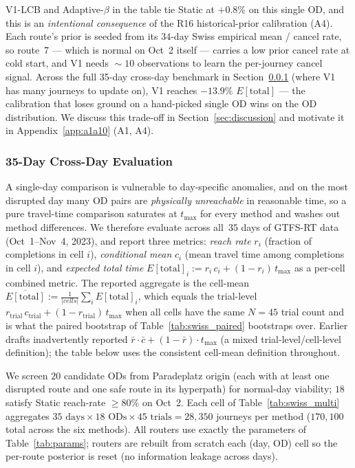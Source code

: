 \documentclass[11pt]{article}
\theoremstyle{definition}
\theoremstyle{remark}
\begin{document}
V1-LCB and Adaptive-$\beta$ in the table tie Static at $+0.8\%$ on
this single OD, and this is an \emph{intentional consequence} of the
R16 historical-prior calibration (A4). Each route's prior is seeded
from its $34$-day Swiss empirical mean / cancel rate, so route~7 ---
which is normal on Oct~2 itself --- carries a low prior cancel
rate at cold start, and V1 needs $\!\sim\!10$ observations to learn
the per-journey cancel signal. Across the full 35-day cross-day
benchmark in Section~\ref{sec:swiss-multi-day} (where V1 has many
journeys to update on), V1 reaches $-13.9\%$ $E[\mathrm{total}]$ ---
the calibration that loses ground on a hand-picked single OD wins
on the OD distribution. We discuss this trade-off in
Section~\ref{sec:discussion} and motivate it in
Appendix~\ref{app:a1a10} (A1, A4).

\subsubsection{35-Day Cross-Day Evaluation}
\label{sec:swiss-multi-day}

A single-day comparison is vulnerable to day-specific anomalies, and
on the most disrupted day many OD pairs are \emph{physically
unreachable} in reasonable time, so a pure travel-time comparison
saturates at $t_{\max}$ for every method and washes out method
differences. We therefore evaluate across all~$35$ days of GTFS-RT
data (Oct~1--Nov~4, 2023), and report three metrics: \emph{reach rate}
$r_i$ (fraction of completions in cell $i$),
\emph{conditional mean} $c_i$ (mean travel time among completions in
cell $i$), and \emph{expected total time}
$E[\mathrm{total}]_i := r_i\,c_i + (1-r_i)\,t_{\max}$ as a per-cell
combined metric. The reported aggregate is the cell-mean
$\overline{E[\mathrm{total}]} := \frac{1}{|cells|}\sum_i E[\mathrm{total}]_i$,
which equals the trial-level
$r_{\mathrm{trial}}\,c_{\mathrm{trial}}+(1-r_{\mathrm{trial}})\,t_{\max}$
when all cells have the same $N=45$ trial count and is what the
paired bootstrap of Table~\ref{tab:swiss_paired} bootstraps over.
Earlier drafts inadvertently reported
$\bar r \cdot \bar c + (1-\bar r)\cdot t_{\max}$ (a mixed
trial-level/cell-level definition); the table below uses the
consistent cell-mean definition throughout.

We screen $20$ candidate ODs from Paradeplatz origin (each with at
least one disrupted route and one safe route in its hyperpath) for
normal-day viability; $18$ satisfy Static reach-rate $\geq 80\%$ on
Oct~2. Each cell of Table~\ref{tab:swiss_multi} aggregates
$35\text{ days}\times18\text{ ODs}\times45\text{ trials} = 28{,}350$
journeys per method ($170{,}100$ total across the six methods). All
routers use exactly the parameters of Table~\ref{tab:params}; routers
are rebuilt from scratch each (day, OD) cell so the per-route
posterior is reset (no information leakage across days).
\end{document}
